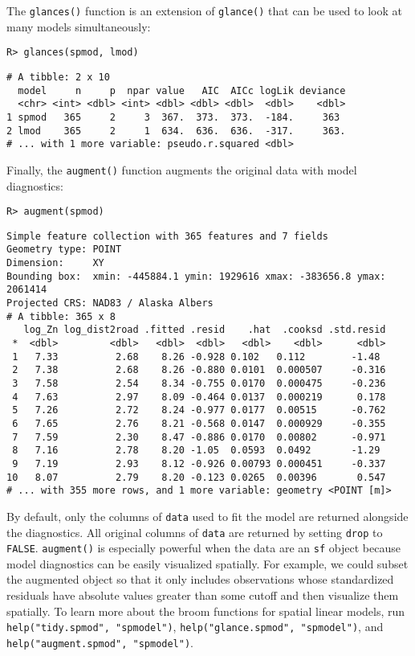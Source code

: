 \documentclass[10pt,letterpaper]{article}
\begin{document}
The \texttt{glances()} function is an extension of \texttt{glance()}
that can be used to look at many models simultaneously:

\begin{verbatim}
R> glances(spmod, lmod)
\end{verbatim}

\begin{verbatim}
# A tibble: 2 x 10
  model     n     p  npar value   AIC  AICc logLik deviance
  <chr> <int> <dbl> <int> <dbl> <dbl> <dbl>  <dbl>    <dbl>
1 spmod   365     2     3  367.  373.  373.  -184.     363 
2 lmod    365     2     1  634.  636.  636.  -317.     363.
# ... with 1 more variable: pseudo.r.squared <dbl>
\end{verbatim}

Finally, the \texttt{augment()} function augments the original data with
model diagnostics:

\begin{verbatim}
R> augment(spmod)
\end{verbatim}

\begin{verbatim}
Simple feature collection with 365 features and 7 fields
Geometry type: POINT
Dimension:     XY
Bounding box:  xmin: -445884.1 ymin: 1929616 xmax: -383656.8 ymax: 2061414
Projected CRS: NAD83 / Alaska Albers
# A tibble: 365 x 8
   log_Zn log_dist2road .fitted .resid    .hat  .cooksd .std.resid
 *  <dbl>         <dbl>   <dbl>  <dbl>   <dbl>    <dbl>      <dbl>
 1   7.33          2.68    8.26 -0.928 0.102   0.112        -1.48 
 2   7.38          2.68    8.26 -0.880 0.0101  0.000507     -0.316
 3   7.58          2.54    8.34 -0.755 0.0170  0.000475     -0.236
 4   7.63          2.97    8.09 -0.464 0.0137  0.000219      0.178
 5   7.26          2.72    8.24 -0.977 0.0177  0.00515      -0.762
 6   7.65          2.76    8.21 -0.568 0.0147  0.000929     -0.355
 7   7.59          2.30    8.47 -0.886 0.0170  0.00802      -0.971
 8   7.16          2.78    8.20 -1.05  0.0593  0.0492       -1.29 
 9   7.19          2.93    8.12 -0.926 0.00793 0.000451     -0.337
10   8.07          2.79    8.20 -0.123 0.0265  0.00396       0.547
# ... with 355 more rows, and 1 more variable: geometry <POINT [m]>
\end{verbatim}

By default, only the columns of \texttt{data} used to fit the model are
returned alongside the diagnostics. All original columns of
\texttt{data} are returned by setting \texttt{drop} to \texttt{FALSE}.
\texttt{augment()} is especially powerful when the data are an
\texttt{sf} object because model diagnostics can be easily visualized
spatially. For example, we could subset the augmented object so that it
only includes observations whose standardized residuals have absolute
values greater than some cutoff and then visualize them spatially. To
learn more about the broom functions for spatial linear models, run
\texttt{help("tidy.spmod",\ "spmodel")},
\texttt{help("glance.spmod",\ "spmodel")}, and
\texttt{help("augment.spmod",\ "spmodel")}.
\end{document}
